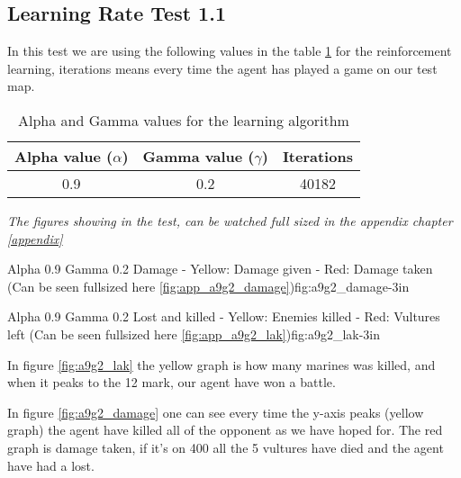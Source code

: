 \subsection*{Learning Rate Test 1.1}
In this test we are using the following values in the table \ref{a9g2_table} for the reinforcement learning, iterations means every time the agent has played a game on our test map.

\begin{centering}
\begin{table}[H]
 \begin{tabular}{|c|c|c|}
	\hline
		Alpha value ($\alpha$) & Gamma value ($\gamma$) & Iterations\\
	\hline
		0.9 & 0.2 & 40182 \\
	\hline
\end{tabular}
\label{a9g2_table}
\caption{Alpha and Gamma values for the learning algorithm}
\end{table}
\end{centering}


\textit{The figures showing in the test, can be watched full sized in the appendix chapter \ref{appendix}} 

			{Alpha 0.9 Gamma 0.2 Damage - Yellow: Damage given - Red: Damage taken (Can be seen fullsized here \ref{fig:app_a9g2_damage})}{fig:a9g2_damage}{-3in}

			{Alpha 0.9 Gamma 0.2 Lost and killed - Yellow: Enemies killed - Red: Vultures left (Can be seen fullsized here \ref{fig:app_a9g2_lak})}{fig:a9g2_lak}{-3in}
			
			
In figure \ref{fig:a9g2_lak} the yellow graph is how many marines was killed, and when it peaks to the 12 mark, our agent have won a battle.




In figure \ref{fig:a9g2_damage} one can see every time the y-axis peaks (yellow graph) the agent have killed all of the opponent as we have hoped for. The red graph is damage taken, if it's on 400 all the 5 vultures have died and the agent have had a lost.

